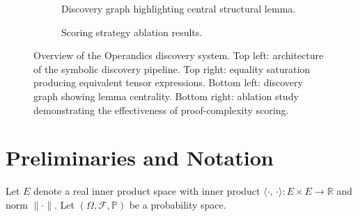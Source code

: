 \documentclass[11pt,a4paper,twocolumn]{article}
\theoremstyle{definition}
\theoremstyle{remark}
\newcommand{\R}{\mathbb{R}}
\newcommand{\Prob}{\mathbb{P}}
\newcommand{\ip}[2]{\langle #1,\, #2 \rangle}
\begin{document}
\begin{figure}[t]
\begin{subfigure}[t]{0.48\textwidth}

\caption{Discovery graph highlighting central structural lemma.}
\end{subfigure}
\hfill
\begin{subfigure}[t]{0.48\textwidth}
\centering


\caption{Scoring strategy ablation results.}
\end{subfigure}

\caption{
Overview of the Operandics discovery system. Top left: architecture of the
symbolic discovery pipeline. Top right: equality saturation producing
equivalent tensor expressions. Bottom left: discovery graph showing lemma
centrality. Bottom right: ablation study demonstrating the effectiveness
of proof-complexity scoring.
}

\end{figure}

\section{Preliminaries and Notation}
\label{sec:prelim}

Let $E$ denote a real inner product space with inner product
$\ip{\cdot}{\cdot} : E \times E \to \R$ and norm $\|\cdot\|$.
Let $(\Omega, \mathcal{F}, \Prob)$ be a probability space.
\end{document}
